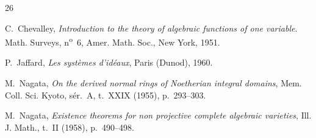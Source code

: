 {}
\renewcommand{\bibname}{Bibliographie \textit{(suite)}}

\begin{thebibliography}{26}

C.~Chevalley,
\emph{Introduction to the theory of algebraic functions of one variable}.
Math. Surveys, n\textsuperscript{o}~6, Amer. Math. Soc., New York, 1951.

P.~Jaffard,
\emph{Les systèmes d'idéaux}, Paris (Dunod), 1960.

M.~Nagata,
\emph{On the derived normal rings of Noetherian integral domains},
Mem. Coll. Sci. Kyoto, sér.~A, t.~XXIX (1955), p.~293--303.

M.~Nagata,
\emph{Existence theorems for non projective complete algebraic varieties},
Ill. J. Math., t.~II (1958), p.~490--498.

\end{thebibliography}
